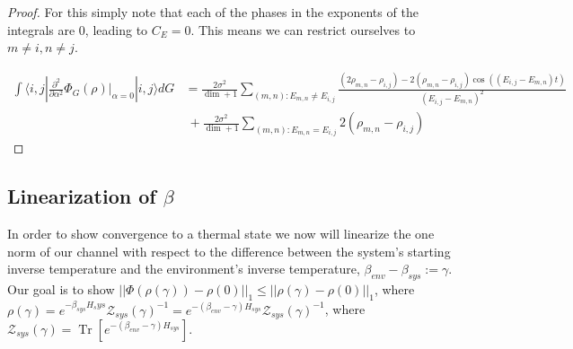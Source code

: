 \documentclass{article}
\newcommand{\ket}[1]{|#1\rangle}
\newcommand{\bra}[1]{\langle #1|}
\newcommand{\brackets}[1]{\left[ #1 \right]}
\newcommand{\norm}[1]{\left| \left| #1 \right| \right|}
\newcommand{\bigo}[1]{\mathcal{O}\left( #1 \right)}
\DeclareMathOperator{\Tr}{Tr}
\newcommand{\trace}[1]{\Tr \brackets{ #1 }}
\newcommand{\partrace}[2]{\Tr_{#1} \brackets{ #2 }}
\newcommand{\partfun}{\mathcal{Z}}
\begin{document}
\begin{proof}
For this simply note that each of the phases in the exponents of the integrals are 0, leading to $C_E = 0$. This means we can restrict ourselves to $m \neq i, n \neq j$. 

\begin{align}
    \int \bra{i,j} \frac{\partial^2}{\partial \alpha^2} \Phi_G(\rho) \bigg|_{\alpha = 0} \ket{i,j} dG &= \frac{2 \sigma^2}{\dim + 1} \sum_{(m,n) : E_{m,n} \neq E_{i,j}} \frac{(2 \rho_{m,n} - \rho_{i,j}) - 2(\rho_{m,n} - \rho_{i,j}) \cos ((E_{i,j} - E_{m,n})t)}{(E_{i,j} - E_{m,n})^2} \nonumber \\
    &~ + \frac{2 \sigma^2}{\dim + 1} \sum_{(m,n) : E_{m,n} = E_{i,j}} 2 (\rho_{m,n} - \rho_{i,j}) \label{eq:second_order_final}
\end{align}
\end{proof}


\subsection{Linearization of $\beta$}
In order to show convergence to a thermal state we now will linearize the one norm of our channel with respect to the difference between the system's starting inverse temperature and the environment's inverse temperature, $\beta_{env} - \beta_{sys} := \gamma$. Our goal is to show $\norm{\Phi(\rho(\gamma)) - \rho(0)}_1 \leq \norm{\rho(\gamma) - \rho(0)}_1$, where $\rho(\gamma) = e^{- \beta_{sys} H_sys} \partfun_{sys}(\gamma)^{-1} = e^{-(\beta_{env} - \gamma) H_{sys}} \partfun_{sys}(\gamma)^{-1}$, where $\partfun_{sys}(\gamma) = \trace{e^{-(\beta_{env} - \gamma) H_{sys}}}$.
\end{document}
